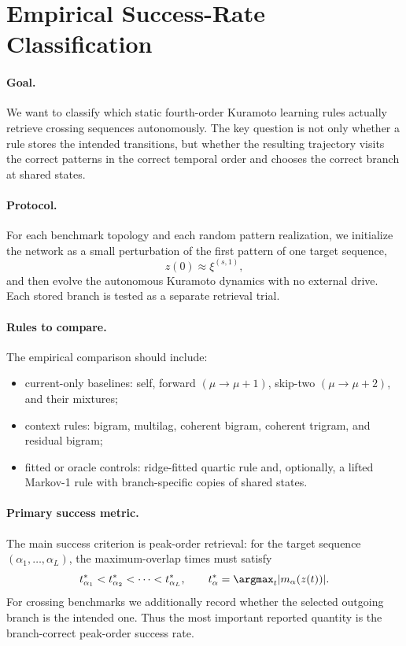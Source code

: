\documentclass[11pt]{article}
\begin{document}
\section{Empirical Success-Rate Classification}

\paragraph{Goal.}
We want to classify which static fourth-order Kuramoto learning rules actually
retrieve crossing sequences autonomously. The key question is not only whether
a rule stores the intended transitions, but whether the resulting trajectory
visits the correct patterns in the correct temporal order and chooses the
correct branch at shared states.

\paragraph{Protocol.}
For each benchmark topology and each random pattern realization, we initialize
the network as a small perturbation of the first pattern of one target sequence,
\begin{equation}
    z(0) \approx \xi^{(s,1)} ,
\end{equation}
and then evolve the autonomous Kuramoto dynamics with no external drive.  Each
stored branch is tested as a separate retrieval trial.

\paragraph{Rules to compare.}
The empirical comparison should include:
\begin{itemize}
    \item current-only baselines: self, forward $(\mu\to\mu+1)$, skip-two
    $(\mu\to\mu+2)$, and their mixtures;
    \item context rules: bigram, multilag, coherent bigram, coherent trigram,
    and residual bigram;
    \item fitted or oracle controls: ridge-fitted quartic rule and, optionally,
    a lifted Markov-1 rule with branch-specific copies of shared states.
\end{itemize}

\paragraph{Primary success metric.}
The main success criterion is peak-order retrieval: for the target sequence
$(\alpha_1,\ldots,\alpha_L)$, the maximum-overlap times must satisfy
\begin{equation}
    t^\ast_{\alpha_1}
    <
    t^\ast_{\alpha_2}
    <
    \cdots
    <
    t^\ast_{\alpha_L},
    \qquad
    t^\ast_{\alpha}
    =
    \argmax_t |m_\alpha(z(t))| .
\end{equation}
For crossing benchmarks we additionally record whether the selected outgoing
branch is the intended one.  Thus the most important reported quantity is the
branch-correct peak-order success rate.
\end{document}
